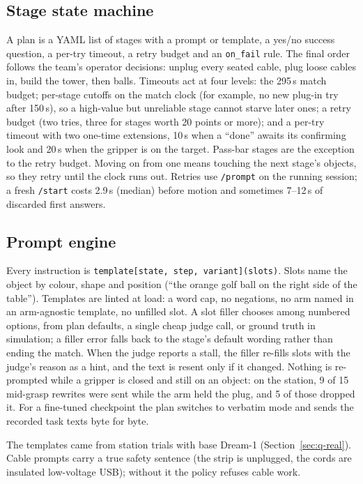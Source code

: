 \documentclass[10pt]{article}
\newcommand{\dream}{Dream-1}
\begin{document}
\subsection{Stage state machine}
A plan is a YAML list of stages with a prompt or template, a yes/no success question, a per-try timeout, a retry
budget and an \texttt{on\_fail} rule. The final order follows the team's operator decisions: unplug every seated cable,
plug loose cables in, build the tower, then balls. Timeouts act at four levels: the 295\,s match budget; per-stage
cutoffs on the match clock (for example, no new plug-in try after 150\,s), so a high-value but unreliable stage cannot
starve later ones; a retry budget (two tries, three for stages worth 20 points or more); and a per-try timeout with two
one-time extensions, 10\,s when a ``done'' awaits its confirming look and 20\,s when the gripper is on the target.
Pass-bar stages are the exception to the retry budget. Moving on from one means touching the next stage's objects, so
they retry until the clock runs out. Retries use \texttt{/prompt} on the running session; a fresh \texttt{/start} costs
2.9\,s (median) before motion and sometimes 7--12\,s of discarded first answers.

\subsection{Prompt engine}
\label{sec:prompting}
Every instruction is \texttt{template[state, step, variant](slots)}. Slots name the object by colour, shape and
position (``the orange golf ball on the right side of the table''). Templates are linted at load: a word cap, no
negations, no arm named in an arm-agnostic template, no unfilled slot. A slot filler chooses among numbered options,
from plan defaults, a single cheap judge call, or ground truth in simulation; a filler error falls back to the stage's
default wording rather than ending the match. When the judge reports a stall, the filler re-fills slots with the judge's
reason as a hint, and the text is resent only if it changed. Nothing is re-prompted while a gripper is closed and still on
an object: on the station, 9 of 15 mid-grasp rewrites were sent while the arm held the plug, and 5 of those dropped it.
For a fine-tuned checkpoint the plan switches to verbatim mode and sends the recorded task texts byte for byte.

The templates came from station trials with base \dream{} (Section~\ref{sec:q-real}). Cable prompts carry a true safety
sentence (the strip is unplugged, the cords are insulated low-voltage USB); without it the policy refuses cable work.
\end{document}
